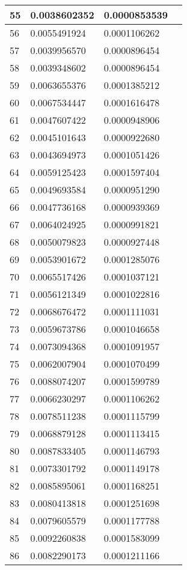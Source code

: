 \documentclass{article}
\begin{document}
\begin{table}[H]
{\begin{tabular}{|l|l|l|l|}
55 & 0.0038602352 & 0.0000853539 \\ \hline
56 & 0.0055491924 & 0.0001106262 \\ \hline
57 & 0.0039956570 & 0.0000896454 \\ \hline
58 & 0.0039348602 & 0.0000896454 \\ \hline
59 & 0.0063655376 & 0.0001385212 \\ \hline
60 & 0.0067534447 & 0.0001616478 \\ \hline
61 & 0.0047607422 & 0.0000948906 \\ \hline
62 & 0.0045101643 & 0.0000922680 \\ \hline
63 & 0.0043694973 & 0.0001051426 \\ \hline
64 & 0.0059125423 & 0.0001597404 \\ \hline
65 & 0.0049693584 & 0.0000951290 \\ \hline
66 & 0.0047736168 & 0.0000939369 \\ \hline
67 & 0.0064024925 & 0.0000991821 \\ \hline
68 & 0.0050079823 & 0.0000927448 \\ \hline
69 & 0.0053901672 & 0.0001285076 \\ \hline
70 & 0.0065517426 & 0.0001037121 \\ \hline
71 & 0.0056121349 & 0.0001022816 \\ \hline
72 & 0.0068676472 & 0.0001111031 \\ \hline
73 & 0.0059673786 & 0.0001046658 \\ \hline
74 & 0.0073094368 & 0.0001091957 \\ \hline
75 & 0.0062007904 & 0.0001070499 \\ \hline
76 & 0.0088074207 & 0.0001599789 \\ \hline
77 & 0.0066230297 & 0.0001106262 \\ \hline
78 & 0.0078511238 & 0.0001115799 \\ \hline
79 & 0.0068879128 & 0.0001113415 \\ \hline
80 & 0.0087833405 & 0.0001146793 \\ \hline
81 & 0.0073301792 & 0.0001149178 \\ \hline
82 & 0.0085895061 & 0.0001168251 \\ \hline
83 & 0.0080413818 & 0.0001251698 \\ \hline
84 & 0.0079605579 & 0.0001177788 \\ \hline
85 & 0.0092260838 & 0.0001583099 \\ \hline
86 & 0.0082290173 & 0.0001211166 \\ \hline

\end{tabular}}
\end{table}
\end{document}
